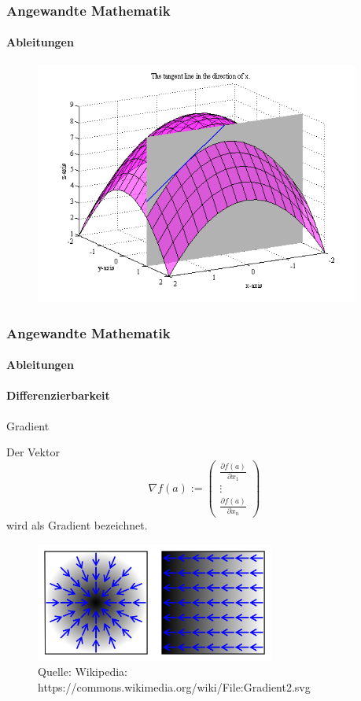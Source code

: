 \documentclass{beamer}
\begin{document}
    \begin{frame}
        \frametitle{Angewandte Mathematik}
        \framesubtitle{Ableitungen}  
    
    \begin{figure}[H]
          \centering
        \includegraphics[width=0.95\textwidth]{images/diffable}
    \end{figure}
    
     \end{frame}





     \begin{frame}
        \frametitle{Angewandte Mathematik}
        \framesubtitle{Ableitungen}

    \framesubtitle{Differenzierbarkeit}
        \begin{block}{Gradient}
    
    Der Vektor 
    $$\nabla f (a) := \begin{pmatrix}  \frac{\partial f(a)}{\partial x_1} \\  \vdots \\ \frac{\partial f(a)}{\partial x_n}  \end{pmatrix}$$
    wird als Gradient bezeichnet. 
    \end{block}
    \begin{figure}[H]
          \centering
        \includegraphics[width=0.7\textwidth]{images/Gradient}
          \caption{Quelle: Wikipedia: https://commons.wikimedia.org/wiki/File:Gradient2.svg}
    \end{figure}
    
    \end{frame}
    
\end{document}
